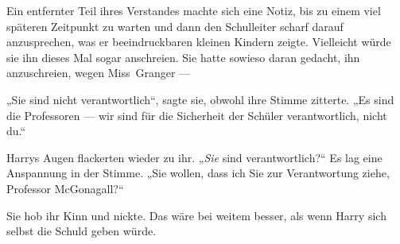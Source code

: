 Ein entfernter Teil ihres Verstandes machte sich eine Notiz, bis zu einem viel späteren Zeitpunkt zu warten und dann den Schulleiter scharf darauf anzusprechen, was er beeindruckbaren kleinen Kindern zeigte. Vielleicht würde sie ihn dieses Mal sogar anschreien. Sie hatte sowieso daran gedacht, ihn anzuschreien, wegen Miss~Granger —

„Sie sind nicht verantwortlich“, sagte sie, obwohl ihre Stimme zitterte.
„Es sind die Professoren — wir sind für die Sicherheit der Schüler verantwortlich, nicht du.“

Harrys Augen flackerten wieder zu ihr.
„\emph{Sie} sind verantwortlich?“ Es lag eine Anspannung in der Stimme.
„Sie wollen, dass ich Sie zur Verantwortung ziehe, Professor McGonagall?“

Sie hob ihr Kinn und nickte. Das wäre bei weitem besser, als wenn Harry sich selbst die Schuld geben würde.

